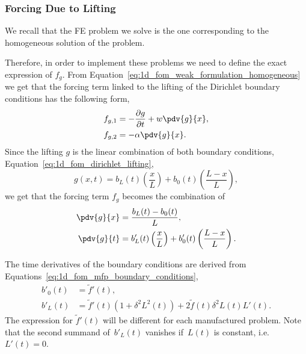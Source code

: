 \documentclass[../../main.tex]{subfiles}
\begin{document}
\subsubsection{Forcing Due to Lifting}
We recall that the FE problem we solve is the one corresponding to the homogeneous solution of the problem. 

Therefore, in order to implement these problems we need to define the exact expression of $f_g$.
From Equation~\eqref{eq:1d_fom_weak_formulation_homogeneous} we get that the forcing term linked to the lifting of the Dirichlet boundary conditions has the following form,
\begin{align}
    f_{g,1} &= - \frac{\partial g}{\partial t} + w \pdv{g}{x}, \\
    f_{g,2} &= - \alpha \pdv{g}{x}.
\end{align}
Since the lifting $g$ is the linear combination of both boundary conditions, Equation~\eqref{eq:1d_fom_dirichlet_lifting},
\begin{equation}
    g(x,t) = b_L(t) \left(\frac{x}{L}\right) + b_0(t) \left(\frac{L - x}{L}\right),
\end{equation}
we get that the forcing term $f_g$ becomes the combination of
\begin{subequations}
    \begin{align}
        \pdv{g}{x} &= \frac{b_L(t) - b_0(t)}{L}, \\
        \pdv{g}{t} &= b'_L(t) \left(\frac{x}{L}\right) + b'_0(t) \left(\frac{L - x}{L}\right)
        .
    \end{align}
\end{subequations}

The time derivatives of the boundary conditions are derived from Equations~\eqref{eq:1d_fom_mfp_boundary_conditions}, 
\begin{subequations}
    \begin{align}
        b'_0(t) &= \tilde{f}'(t), \\
        b'_L(t) &= \tilde{f}'(t)\left(1 + \delta^2L^2(t)\right) + 2\tilde{f}(t) \delta^2 L(t)L'(t).
    \end{align}
\end{subequations}
The expression for $\tilde{f}'(t)$ will be different for each manufactured problem.
Note that the second summand of~$b'_L(t)$ vanishes if~$L(t)$ is constant, i.e. $L'(t)=0$.  
\end{document}
